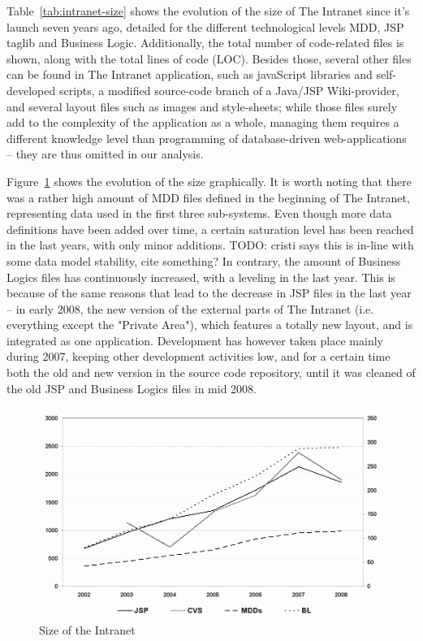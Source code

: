 \documentclass{acm_proc_article-sp}
\begin{document}
Table~\ref{tab:intranet-size} shows the evolution of the size of The Intranet since it's launch seven years ago, detailed for the different technological levels MDD, JSP taglib and Business Logic. Additionally, the total number of code-related files is shown, along with the total lines of code (LOC). Besides those, several other files can be found in The Intranet application, such as javaScript libraries and self-developed scripts, a modified source-code branch of a Java/JSP Wiki-provider, and several layout files such as images and style-sheets; while those files surely add to the complexity of the application as a whole, managing them requires a different knowledge level than programming of database-driven web-applications -- they are thus omitted in our analysis.

Figure~\ref{fig:intranet-size} shows the evolution of the size graphically. It is worth noting that there was a rather high amount of MDD files defined in the beginning of The Intranet, representing data used in the first three sub-systems. Even though more data definitions have been added over time, a certain saturation level has been reached in the last years, with only minor additions. TODO: cristi says this is in-line with some data model stability, cite something?
In contrary, the amount of Business Logics files has continuously increased, with a leveling in the last year. This is because of the same reasons that lead to the decrease in JSP files in the last year -- in early 2008, the new version of the external parts of The Intranet (i.e. everything except the "Private Area"), which features a totally new layout, and is integrated as one application. Development has however taken place mainly during 2007, keeping other development activities low, and for a certain time both the old and new version in the source code repository, until it was cleaned of the old JSP and Business Logics files in mid 2008.

\begin{figure}\label{fig:intranet-size}
  \includegraphics[width=0.98\columnwidth]{figures/SizeChart}
  \caption{Size of the Intranet}
\end{figure} 
\end{document}
